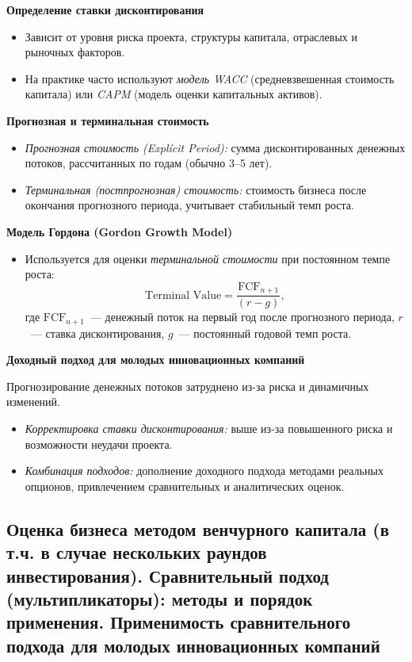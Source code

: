 \textbf{Определение ставки дисконтирования}
\begin{itemize}
    \item Зависит от уровня риска проекта, структуры капитала, отраслевых и рыночных факторов.
    \item На практике часто используют \textit{модель WACC} (средневзвешенная стоимость капитала) или \textit{CAPM} (модель оценки капитальных активов).
\end{itemize}

\textbf{Прогнозная и терминальная стоимость}
\begin{itemize}
    \item \textit{Прогнозная стоимость (Explícit Period):} сумма дисконтированных денежных потоков, рассчитанных по годам (обычно 3--5 лет).
    \item \textit{Терминальная (постпрогнозная) стоимость:} стоимость бизнеса после окончания прогнозного периода, учитывает стабильный темп роста.
\end{itemize}

\textbf{Модель Гордона (Gordon Growth Model)}
\begin{itemize}
    \item Используется для оценки \textit{терминальной стоимости} при постоянном темпе роста:
    \[
      \text{Terminal Value} = \frac{\text{FCF}_{n+1}}{(r - g)},
    \]
    где $\text{FCF}_{n+1}$~--- денежный поток на первый год после прогнозного периода, $r$~--- ставка дисконтирования, $g$~--- постоянный годовой темп роста.
\end{itemize}

\textbf{Доходный подход для молодых инновационных компаний}

Прогнозирование денежных потоков затруднено из-за риска и динамичных изменений.
\begin{itemize}
    \item \textit{Корректировка ставки дисконтирования:} выше из-за повышенного риска и возможности неудачи проекта.
    \item \textit{Комбинация подходов:} дополнение доходного подхода методами реальных опционов, привлечением сравнительных и аналитических оценок.
\end{itemize}
\pagebreak

\subsection{Оценка бизнеса методом венчурного капитала (в т.ч. в случае нескольких раундов инвестирования). Сравнительный подход (мультипликаторы): методы и порядок применения. Применимость сравнительного подхода для молодых инновационных компаний}

